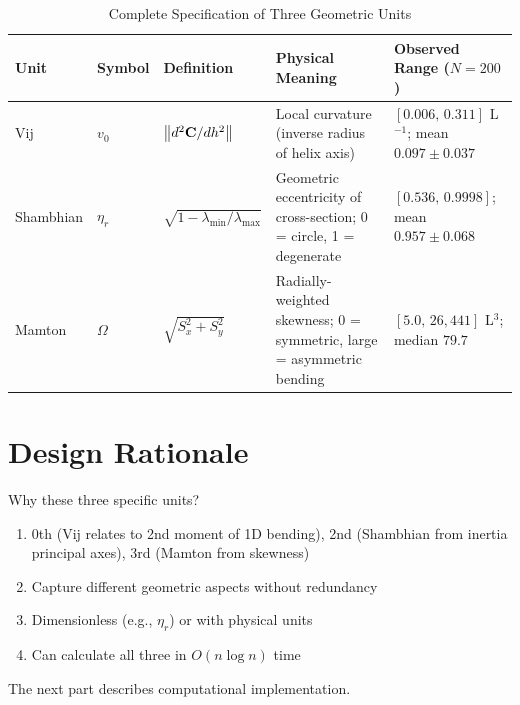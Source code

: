 \begin{table}[h]
    \centering
    \caption{Complete Specification of Three Geometric Units}
    \begin{tabularx}{\textwidth}{lXXXX}
        \toprule
        \textbf{Unit} & \textbf{Symbol} & \textbf{Definition} & \textbf{Physical Meaning} & \textbf{Observed Range ($N=200$)} \\
        \midrule
        Vij & $v_0$ & $\left\lVert d^2\mathbf{C}/dh^2\right\rVert$ & Local curvature (inverse radius of helix axis) & $[0.006,\,0.311]$ L$^{-1}$; mean $0.097 \pm 0.037$ \\
        \addlinespace
        Shambhian & $\eta_r$ & $\sqrt{1 - \lambda_{\min}/\lambda_{\max}}$ & Geometric eccentricity of cross-section; 0 = circle, 1 = degenerate & $[0.536,\,0.9998]$; mean $0.957 \pm 0.068$ \\
        \addlinespace
        Mamton & $\Omega$ & $\sqrt{S_x^2 + S_y^2}$ & Radially-weighted skewness; 0 = symmetric, large = asymmetric bending & $[5.0,\,26{,}441]$ L$^3$; median $79.7$ \\
        \bottomrule
    \end{tabularx}
\end{table}

\section{Design Rationale}

Why these three specific units?

\begin{enumerate}
    \item {} 0th (Vij relates to 2nd moment of 1D bending), 2nd (Shambhian from inertia principal axes), 3rd (Mamton from skewness)
    
    \item {} Capture different geometric aspects without redundancy
    
    \item {} Dimensionless (e.g., $\eta_r$) or with physical units
    
    \item {} Can calculate all three in $O(n \log n)$ time
\end{enumerate}

The next part describes computational implementation.
